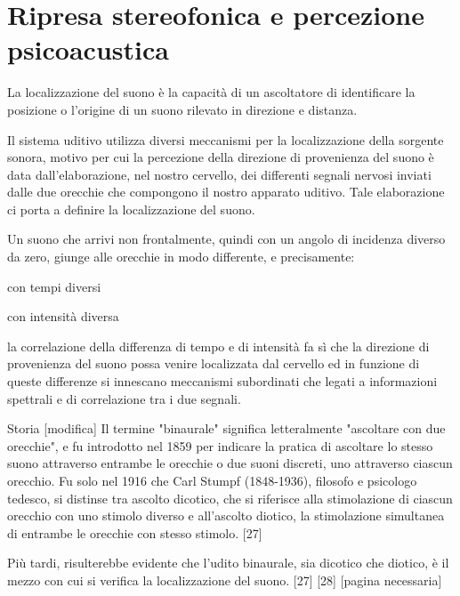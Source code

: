 \section{Ripresa stereofonica e percezione psicoacustica}

La localizzazione del suono è la capacità di un ascoltatore di identificare la
posizione o l'origine di un suono rilevato in direzione e distanza.

Il sistema uditivo utilizza diversi meccanismi per la localizzazione della
sorgente sonora, motivo per cui la percezione della direzione di provenienza del
suono è data dall’elaborazione, nel nostro cervello, dei differenti segnali
nervosi inviati dalle due orecchie che compongono il nostro apparato uditivo.
Tale elaborazione ci porta a definire la localizzazione del suono.

Un suono che arrivi non frontalmente, quindi con un angolo di incidenza
diverso da zero, giunge alle orecchie in modo differente, e precisamente:

\begin{compactitem}
\item con tempi diversi
\item con intensità diversa
\end{compactitem}

la correlazione della differenza di tempo e di intensità fa sì che la
direzione di provenienza del suono possa venire localizzata dal cervello ed in
funzione di queste differenze si innescano meccanismi subordinati che legati a
informazioni spettrali e di correlazione tra i due segnali.

Storia [modifica]
Il termine "binaurale" significa letteralmente "ascoltare con due orecchie", e fu introdotto nel 1859 per indicare la pratica di ascoltare lo stesso suono attraverso entrambe le orecchie o due suoni discreti, uno attraverso ciascun orecchio. Fu solo nel 1916 che Carl Stumpf (1848-1936), filosofo e psicologo tedesco, si distinse tra ascolto dicotico, che si riferisce alla stimolazione di ciascun orecchio con uno stimolo diverso e all'ascolto diotico, la stimolazione simultanea di entrambe le orecchie con stesso stimolo. [27]

Più tardi, risulterebbe evidente che l'udito binaurale, sia dicotico che diotico, è il mezzo con cui si verifica la localizzazione del suono. [27] [28] [pagina necessaria]

